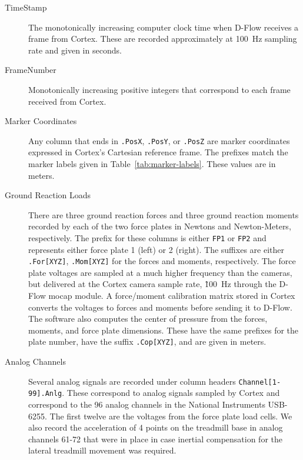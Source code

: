 \documentclass[fleqn,12pt]{wlpeerj}
\begin{document}
\begin{description}
  \item[TimeStamp] The monotonically increasing computer clock time when D-Flow
    receives a frame from Cortex. These are recorded approximately at
    100~\si{\hertz} sampling rate and given in seconds.
  \item[FrameNumber] Monotonically increasing positive integers that correspond
    to each frame received from Cortex.
  \item[Marker Coordinates] Any column that ends in \verb+.PosX+, \verb+.PosY+,
    or \verb+.PosZ+ are marker coordinates expressed in Cortex's Cartesian
    reference frame. The prefixes match the marker labels given in
    Table~\ref{tab:marker-labels}. These values are in meters.
  \item[Ground Reaction Loads] There are three ground reaction forces and three
    ground reaction moments recorded by each of the two force plates in Newtons
    and Newton-Meters, respectively. The prefix for these columns is either
    \verb+FP1+ or \verb+FP2+ and represents either force plate 1 (left) or 2
    (right). The suffixes are either \verb+.For[XYZ]+, \verb+.Mom[XYZ]+ for the
    forces and moments, respectively. The force plate voltages are sampled at a
    much higher frequency than the cameras, but delivered at the Cortex camera
    sample rate, \~100~\si{\hertz} through the D-Flow mocap module. A
    force/moment calibration matrix stored in Cortex converts the voltages to
    forces and moments before sending it to D-Flow. The software also computes
    the center of pressure from the forces, moments, and force plate
    dimensions. These have the same prefixes for the plate number, have the
    suffix \verb+.Cop[XYZ]+, and are given in meters.
  \item[Analog Channels] Several analog signals are recorded under column
    headers \verb+Channel[1-99].Anlg+. These correspond to analog signals
    sampled by Cortex and correspond to the 96 analog channels in the National
    Instruments USB-6255. The first twelve are the voltages from the
    force plate load cells. We also record the acceleration of 4 points on the
    treadmill base in analog channels 61-72 that were in place in case inertial
    compensation for the lateral treadmill movement was required.
\end{description}
\end{document}
